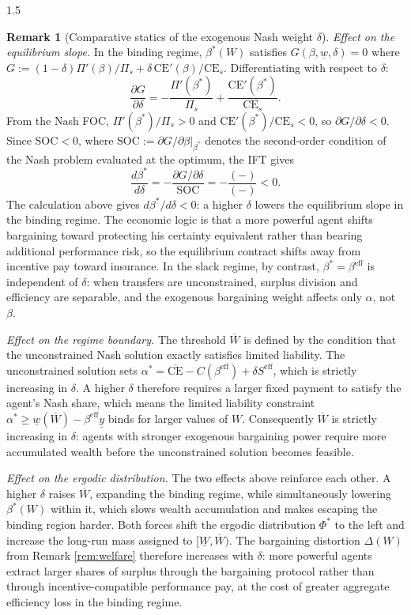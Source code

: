 \documentclass[12pt]{article}
\theoremstyle{definition}
\newtheorem{remark}{Remark}[section]
\theoremstyle{plain}
\begin{document}
\begin{spacing}{1.5}
\begin{remark}[Comparative statics of the exogenous Nash weight $\delta$]
\textit{Effect on the equilibrium slope.} In the binding regime, $\beta^*(W)$ satisfies $G(\beta, \underline{w}, \delta) = 0$ where $G := (1-\delta)\Pi'(\beta)/\Pi_s + \delta\,\mathrm{CE}'(\beta)/\mathrm{CE}_s$. Differentiating with respect to $\delta$:
\[
\frac{\partial G}{\partial\delta} = -\frac{\Pi'(\beta^*)}{\Pi_s} + \frac{\mathrm{CE}'(\beta^*)}{\mathrm{CE}_s}.
\]
From the Nash FOC, $\Pi'(\beta^*)/\Pi_s > 0$ and $\mathrm{CE}'(\beta^*)/\mathrm{CE}_s < 0$, so $\partial G/\partial\delta < 0$. Since $\mathrm{SOC} < 0$, where $\mathrm{SOC} := \partial G/\partial\beta\big|_{\beta^*}$ denotes the second-order condition of the Nash problem evaluated at the optimum, the IFT gives
\[
\frac{d\beta^*}{d\delta} = -\frac{\partial G/\partial\delta}{\mathrm{SOC}} = -\frac{(-)}{(-)} < 0.
\]
The calculation above gives $d\beta^*/d\delta < 0$: a higher $\delta$ lowers the equilibrium slope in the binding regime. The economic logic is that a more powerful agent shifts bargaining toward protecting his certainty equivalent rather than bearing additional performance risk, so the equilibrium contract shifts away from incentive pay toward insurance. In the slack regime, by contrast, $\beta^* = \beta^{\mathrm{eff}}$ is independent of $\delta$: when transfers are unconstrained, surplus division and efficiency are separable, and the exogenous bargaining weight affects only $\alpha$, not $\beta$.

\textit{Effect on the regime boundary.} The threshold $\overline{W}$ is defined by the condition that the unconstrained Nash solution exactly satisfies limited liability. The unconstrained solution sets $\alpha^* = \overline{\mathrm{CE}} - C(\beta^{\mathrm{eff}}) + \delta S^{\mathrm{eff}}$, which is strictly increasing in $\delta$. A higher $\delta$ therefore requires a larger fixed payment to satisfy the agent's Nash share, which means the limited liability constraint $\alpha^* \geq \underline{w}(\overline{W}) - \beta^{\mathrm{eff}}\underline{y}$ binds for larger values of $W$. Consequently $\overline{W}$ is strictly increasing in $\delta$: agents with stronger exogenous bargaining power require more accumulated wealth before the unconstrained solution becomes feasible.

\textit{Effect on the ergodic distribution.} The two effects above reinforce each other. A higher $\delta$ raises $\overline{W}$, expanding the binding regime, while simultaneously lowering $\beta^*(W)$ within it, which slows wealth accumulation and makes escaping the binding region harder. Both forces shift the ergodic distribution $\Phi^*$ to the left and increase the long-run mass assigned to $[\underline{W}, \overline{W})$. The bargaining distortion $\Delta(W)$ from Remark \ref{rem:welfare} therefore increases with $\delta$: more powerful agents extract larger shares of surplus through the bargaining protocol rather than through incentive-compatible performance pay, at the cost of greater aggregate efficiency loss in the binding regime.


\end{remark}
\end{spacing}
\end{document}
